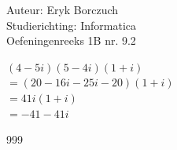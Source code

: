\documentclass[a4paper]{article}
\begin{document}
  
\noindent \large Auteur: Eryk Borczuch \\
\noindent \large Studierichting: Informatica\\
\noindent \large Oefeningenreeks 1B nr. 9.2\\

\medskip

\normalsize

$(4-5i)(5-4i)(1+i)$\\

$=(20-16i-25i-20)(1+i)$\\

$=41i(1+i)$\\

$= -41 -41i$\\

\begin{thebibliography}{999}
\end{thebibliography}
\end{document}
